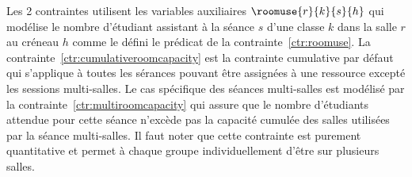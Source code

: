 Les 2 contraintes utilisent les variables auxiliaires $\roomuse{r}{k}{s}{h}$ 
qui modélise le nombre d'étudiant assistant à la séance $s$ d'une classe $k$ dans la salle $r$ au créneau $h$ comme le défini le prédicat de la contrainte~\ref{ctr:roomuse}. 
La contrainte~\ref{ctr:cumulativeroomcapacity} est la contrainte cumulative par défaut qui s'applique à toutes les sérances pouvant être assignées à une ressource excepté les sessions multi-salles.
Le cas spécifique des séances multi-salles est modélisé par la contrainte~\ref{ctr:multiroomcapacity}
qui assure que le nombre d'étudiants attendue pour cette séance n'excède pas la capacité cumulée des salles utilisées par la séance multi-salles.
Il faut noter que cette contrainte est purement quantitative et permet à chaque groupe individuellement d'être sur plusieurs  salles.




